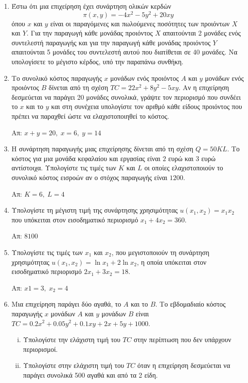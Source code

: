 \begin{enumerate}
  \item Έστω ότι μια επιχείρηση έχει συνάρτηση ολικών κερδών
    \[
      \pi (x,y) = -4x^{2}-5y^{2}+20xy
     \] 
     όπου $ x $ και $ y $ είναι οι παραγόμενες και πωλούμενες ποσότητες των προιόντων 
     $ X $ και $ Y $. Για την παραγωγή κάθε μονάδας προιόντος $X$ απαιτούνται 2 μονάδες 
     ενός συντελεστή παραγωγής και για την παραγωγή κάθε μονάδας προιόντος $Y$ 
     απαιτούνται 5 μονάδες του συντελεστή αυτού που διατίθεται σε 40 μονάδες. Να 
     υπολογίσετε το μέγιστο κέρδος, υπό την παραπάνω συνθήκη.

\item Το συνολικό κόστος παραγωγής $x$ μονάδων ενός προιόντος $A$ και $y$ μονάδων ενός 
  προιόντος $B$ δίνεται από τη σχέση $ TC = 22x^{2} + 8 y^{2} - 5xy $. Αν η επιχείρηση 
  δεσμεύεται να παράγει 20 μονάδες συνολικά, γράψτε τον περιορισμό που συνδέει το 
  $x$ και το $y$ και στη συνέχεια υπολογίστε τον αριθμό κάθε είδους προιόντος που 
  πρέπει να παραχθεί ώστε να ελαχιστοποιηθεί το κόστος.

  \hfill Απ: $ x+y=20, \; x=6, \; y=14 $

\item Η συνάρτηση παραγωγής μιας επιχείρησης δίνεται από τη σχέση $ Q=50KL $. Το 
  κόστος για μια μονάδα κεφαλαίου και εργασίας είναι $ 2 $ ευρώ και $ 3 $ ευρώ 
  αντίστοιχα. Υπολογίστε τις τιμές των $ K $ και $ L $ οι οποίες ελαχιστοποιούν 
  το συνολικό κόστος εισροών αν ο στόχος παραγωγής είναι $1200$.

\hfill Απ: $K=6, \; L=4$  

\item Υπολογίστε τη μέγιστη τιμή της συνάρτησης χρησιμότητας $ u(x_{1}, x_{2}) = x_{1}
  x_{2} $ που υπόκειται στον εισοδηματικό περιορισμό $ x_{1}+4 x_{2}=360 $.

  \hfill Απ: $ 8100 $

\item Υπολογίστε τις τιμές των $ x_{1} $ και $ x_{2} $, που μεγιστοποιούν τη 
  συνάρτηση χρησιμότητας $ u(x_{1}, x_{2}) = \ln{x_{1}} + 2 \ln{x_{2}} $, η οποία  
  υπόκειται στον εισοδηματικό περιορισμό $ 2x_{1}+3 x_{2}=18 $.

  \hfill Απ: $x1 = 3, \; x_{2}=4$

\item Μια επιχείρηση παράγει δύο αγαθά, το $A$ και το $B$. Το εβδομαδιαίο κόστος
  παραγωγής $x$ μονάδων $A$ και $y$ μονάδων $B$ είναι $ TC=0.2 x^{2}+0.05y^{2} +0.1xy
  +2x+5y+1000 $.
  \begin{enumerate}[i)]
    \item Υπολογίστε την ελάχιστη τιμή του $ TC $ στην περίπτωση που δεν υπάρχουν 
      περιορισμοί.
    \item Υπολογίστε στην ελάχιστη τιμή του $ TC $ όταν η επιχείρηση δεσμεύεται να 
      παράγει συνολικά 500 αγαθά και από τα 2 είδη.


\end{enumerate}
\end{enumerate}
